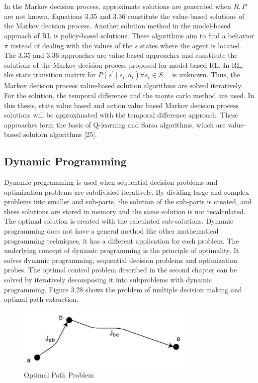 \documentclass[12pt,twoside,a4]{mwbk}
\begin{document}
\\ \\
In the Markov decision process, approximate solutions are generated when $R, P$ are not known. Equations 3.35 and 3.36 constitute the value-based solutions of the Markov decision process. Another solution method in the model-based approach of RL is policy-based solutions. These algorithms aim to find a behavior $\pi$ instead of dealing with the values of the $s$ states where the agent is located. The 3.35 and 3.36 approaches are value-based approaches and constitute the solutions of the Markov decision process proposed for model-based RL. In RL, the state transition matrix for $P\left(s^{\prime} \mid s_{t}, a_{t}\right) \forall s_{t} \in S \quad$ is unknown. Thus, the Markov decision process value-based solution algorithms are solved iteratively. For the solution, the temporal difference and the monte carlo method are used. In this thesis, state value based and action value based Markov decision process solutions will be approximated with the temporal difference approach. These approaches form the basis of Q-learning and Sarsa algorithms, which are value-based solution algorithms [25].

\subsection{Dynamic Programming}
Dynamic programming is used when sequential decision problems and optimization problems are subdivided iteratively. By dividing large and complex problems into smaller and sub-parts, the solution of the sub-parts is created, and these solutions are stored in memory and the same solution is not recalculated. The optimal solution is created with the calculated sub-solutions. Dynamic programming does not have a general method like other mathematical programming techniques, it has a different application for each problem. The underlying concept of dynamic programming is the principle of optimality. It solves dynamic programming, sequential decision problems and optimization probes. The optimal control problem described in the second chapter can be solved by iteratively decomposing it into subproblems with dynamic programming. Figure 3.28 shows the problem of multiple decision making and optimal path extraction.
\begin{figure}[h]
    \centering
    \includegraphics[width=8.5 cm, height=3.0cm]{optimal_path_1.jpg}
    \caption{Optimal Path Problem}
\end{figure}
\end{document}
